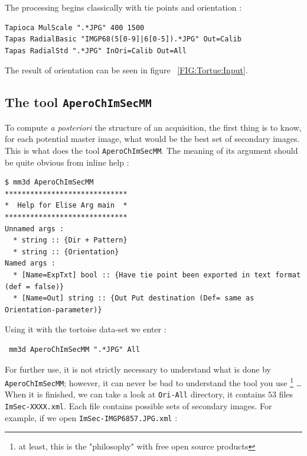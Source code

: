 The processing begins classically with tie points and orientation :

\begin{verbatim}
Tapioca MulScale ".*JPG" 400 1500
Tapas RadialBasic "IMGP68(5[0-9]|6[0-5]).*JPG" Out=Calib
Tapas RadialStd ".*JPG" InOri=Calib Out=All
\end{verbatim}

The result of orientation can be seen in figure ~\ref{FIG:Tortue:Input}.



\subsection{The tool {\tt AperoChImSecMM}}

To compute \emph{a posteriori} the structure of an acquisition, the first thing is to know,
for each potential master image, what would be the best set of secondary  images.
This is what does the tool {\tt AperoChImSecMM}. The meaning of its argument should be
quite obvious from inline help :

\begin{verbatim}
$ mm3d AperoChImSecMM
*****************************
*  Help for Elise Arg main  *
*****************************
Unnamed args :
  * string :: {Dir + Pattern}
  * string :: {Orientation}
Named args :
  * [Name=ExpTxt] bool :: {Have tie point been exported in text format (def = false)}
  * [Name=Out] string :: {Out Put destination (Def= same as Orientation-parameter)}
\end{verbatim}

Using it with the tortoise data-set we enter :

\begin{verbatim}
 mm3d AperoChImSecMM ".*JPG" All
\end{verbatim}

For further use, it is not strictly necessary to understand what is done
 by {\tt AperoChImSecMM}; however, it  can never be bad to understand the tool you use
\footnote{at least, this is the "philosophy" with free open source products} \dots
When it is finished, we can take a look at  {\tt Ori-All} directory, it
contains $53$ files  {\tt ImSec-XXXX.xml}. Each file contains possible sets of secondary images.
For example, if we open {\tt ImSec-IMGP6857.JPG.xml}  :

